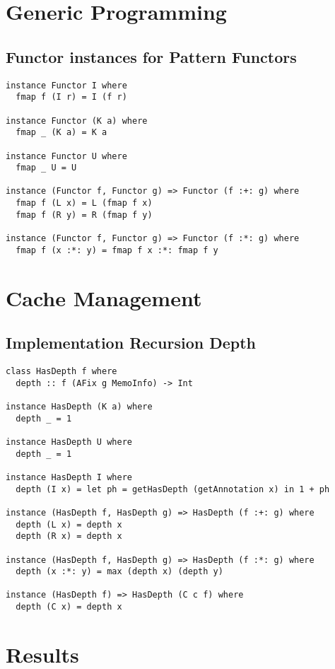 \appendix
\chapter{Generic Programming}
\section{Functor instances for Pattern Functors}
\label{app-inst-functor-patfun}
\begin{verbatim}
instance Functor I where
  fmap f (I r) = I (f r)

instance Functor (K a) where
  fmap _ (K a) = K a

instance Functor U where
  fmap _ U = U

instance (Functor f, Functor g) => Functor (f :+: g) where
  fmap f (L x) = L (fmap f x)
  fmap f (R y) = R (fmap f y)

instance (Functor f, Functor g) => Functor (f :*: g) where
  fmap f (x :*: y) = fmap f x :*: fmap f y
\end{verbatim}

\chapter{Cache Management}
\section{Implementation Recursion Depth}
\label{app-sec-impl-rec-depth}
\begin{verbatim}
class HasDepth f where
  depth :: f (AFix g MemoInfo) -> Int

instance HasDepth (K a) where
  depth _ = 1

instance HasDepth U where
  depth _ = 1

instance HasDepth I where
  depth (I x) = let ph = getHasDepth (getAnnotation x) in 1 + ph

instance (HasDepth f, HasDepth g) => HasDepth (f :+: g) where
  depth (L x) = depth x
  depth (R x) = depth x

instance (HasDepth f, HasDepth g) => HasDepth (f :*: g) where
  depth (x :*: y) = max (depth x) (depth y)

instance (HasDepth f) => HasDepth (C c f) where
  depth (C x) = depth x
\end{verbatim}

\chapter{Results}

